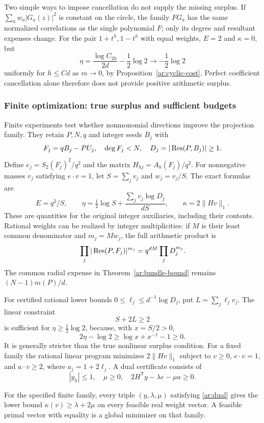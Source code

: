 \begin{remark}\label{ar:failed-complementary}
Two simple ways to impose cancellation do not supply the missing surplus.
If $\sum_aw_a|G_a(z)|^2$ is constant on the circle, the family $FG_a$ has the same normalized correlations as the single polynomial $F$; only its degree and resultant expenses change.
For the pair $1+t^h,1-t^h$ with equal weights, $E=2$ and $\kappa=0$, but
\[
 \eta=\frac{\log C_{2h}}{2d}-\frac12\log2
       \longrightarrow-\frac12\log2
\]
uniformly for $h\le Cd$ as $m\to0$, by Proposition~\ref{ar:cyclic-cost}.
Perfect coefficient cancellation alone therefore does not provide positive arithmetic surplus.
\end{remark}

\subsubsection{Finite optimization: true surplus and sufficient budgets}
\label{ar:finite}

Finite experiments test whether nonmonomial directions improve the projection family.
They retain $P,N,q$ and integer seeds $B_j$ with
\[
 F_j=qB_j-PU_j,\quad \deg F_j<N,\quad
 D_j=|\operatorname{Res}(P,B_j)|\ge1.
\]
Define $e_j=S_2(F_j)^2/q^2$ and the matrix $H_{hj}=A_h(F_j)/q^2$.
For nonnegative masses $v_j$ satisfying $e\cdot v=1$, let $S=\sum_jv_j$ and $w_j=v_j/S$.
The exact formulas are
\begin{equation}
 E=q^2/S,\qquad
 \eta=\tfrac12\log S+\frac{\sum_jv_j\log D_j}{dS},\qquad
 \kappa=2\|Hv\|_1.
 \label{ar:finite-normalization}
\end{equation}
These are quantities for the original integer auxiliaries, including their contents.
Rational weights can be realized by integer multiplicities: if $M$ is their least common denominator and $m_j=Mw_j$, the full arithmetic product is
\[
 \prod_j|\operatorname{Res}(P,F_j)|^{m_j}
       =q^{dM}\prod_jD_j^{m_j}.
\]
The common radial expense in Theorem~\ref{ar:bundle-bound} remains $(N-1)m(P)/d$.

For certified rational lower bounds $0\le\ell_j\le d^{-1}\log D_j$, put $L=\sum_j\ell_jv_j$.
The linear constraint
\begin{equation}
 S+2L\ge2
 \label{ar:sufficient-budget}
\end{equation}
is sufficient for $\eta\ge\frac12\log2$, because, with $x=S/2>0$,
\[
 2\eta-\log2\ge\log x+x^{-1}-1\ge0.
\]
It is generally stricter than the true nonlinear surplus condition.
For a fixed family the rational linear program minimizes $2\|Hv\|_1$ subject to $v\ge0$, $e\cdot v=1$, and $a\cdot v\ge2$, where $a_j=1+2\ell_j$.
A dual certificate consists of
\begin{equation}
 |y_h|\le1,\quad \mu\ge0,\quad
 2H^{\mathsf T}y-\lambda e-\mu a\ge0.
 \label{ar:dual}
\end{equation}
\begin{proposition}\label{ar:finite-certificate}
For the specified finite family, every triple $(y,\lambda,\mu)$ satisfying \eqref{ar:dual} gives the lower bound $\kappa(v)\ge\lambda+2\mu$ on every feasible real weight vector.
A feasible primal vector with equality is a global minimizer on that family.
\end{proposition}

